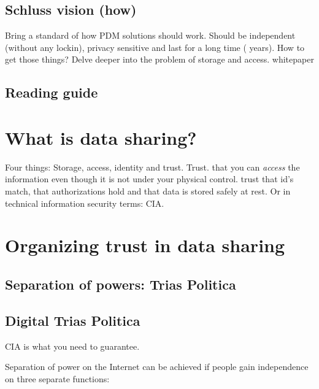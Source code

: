 \documentclass{article}
\begin{document}
\subsection{Schluss vision (how)}
Bring a standard of how PDM solutions should work. Should be independent (without any lockin), privacy sensitive and last for a long time ( years). How to get those things? Delve deeper into the problem of storage and access. \-\> whitepaper

\subsection{Reading guide}

\section{What is data sharing?}
Four things:
Storage, access, identity and trust.
Trust. that you can \emph{access} the information even though it is not under your physical control. trust that id's match, that authorizations hold and that data is stored safely at rest. Or in technical information security terms: CIA.

\section{Organizing trust in data sharing}
\subsection{Separation of powers: Trias Politica}
\subsection{Digital Trias Politica}
CIA is what you need to guarantee.

Separation of power on the Internet can be achieved if people gain independence on three separate functions:
\end{document}
